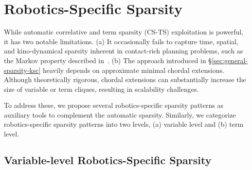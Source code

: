 
\section{Robotics-Specific Sparsity}
\label{sec:robotics-specific}

While automatic correlative and term sparsity (CS-TS) exploitation is powerful, it has two notable limitations. 
(a) It occasionally fails to capture time, spatial, and kino-dynamical sparsity inherent in contact-rich planning problems, such as the Markov property described in~\cite{kang2024wafr-strom}.
(b) The approach introduced in \S\ref{sec:general-sparsity-ksc} heavily depends on approximate minimal chordal extensions. Although theoretically rigorous, chordal extensions can substantially increase the size of variable or term cliques, resulting in scalability challenges.

To address these, we propose several robotics-specific sparsity patterns as auxiliary tools to complement the automatic sparsity. Similarly, we categorize robotics-specific sparsity patterns into two levels, (a) variable level and (b) term level.



\subsection{Variable-level Robotics-Specific Sparsity}
% 

